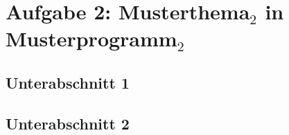 \pagebreak
\section{Aufgabe 2: Musterthema$_2$ in Musterprogramm$_2$}
\subsection{Unterabschnitt 1}
\subsection{Unterabschnitt 2}
